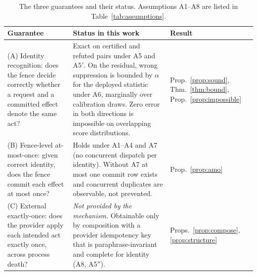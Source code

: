 \begin{table}[!tbp]
\centering\small
\caption{The three guarantees and their status. Assumptions A1--A8 are listed in Table~\ref{tab:assumptions}.}\label{tab:guarantees}
\begin{tabularx}{\linewidth}{@{}p{3.4cm}Xp{2.2cm}@{}}
\toprule
Guarantee & Status in this work & Result \\
\midrule
(A) Identity recognition: does the fence decide correctly whether a request and a committed effect denote the same act? & Exact on certified and refuted pairs under A5 and A5$'$. On the residual, wrong suppression is bounded by $\alpha$ for the deployed statistic under A6, marginally over calibration draws. Zero error in both directions is impossible on overlapping score distributions. & Prop.~\ref{prop:sound}, Thm.~\ref{thm:bound}, Prop.~\ref{prop:impossible} \\
(B) Fence-level at-most-once: given correct identity, does the fence commit each effect at most once? & Holds under A1--A4 and A7 (no concurrent dispatch per identity). Without A7 at most one commit row exists and concurrent duplicates are observable, not prevented. & Prop.~\ref{prop:amo} \\
(C) External exactly-once: does the provider apply each intended act exactly once, across process death? & \emph{Not provided by the mechanism.} Obtainable only by composition with a provider idempotency key that is paraphrase-invariant and complete for identity (A8, A5$''$). & Props.~\ref{prop:compose}, \ref{prop:structure} \\
\bottomrule
\end{tabularx}
\end{table}
